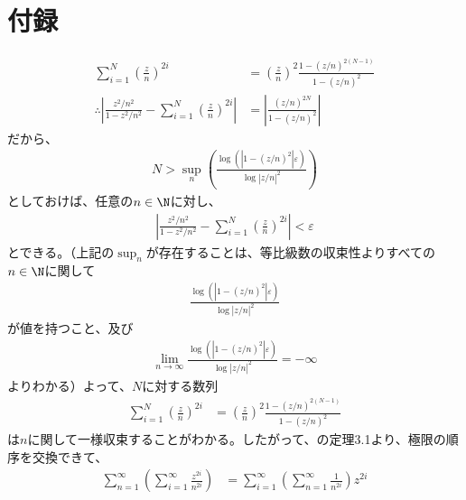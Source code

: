 \documentclass[10pt,onecolumn,dvipdfmx]{jsarticle}
\begin{document}
\section*{付録}
\begin{align}
\sum_{i=1} ^{N} \left( \frac{z}{n} \right) ^{2i} &= \left( \frac{z}{n} \right) ^{2} \frac{1-\left( z / n\right) ^{2\left( N - 1\right) } }{1 - \left( z / n\right) ^{2} } \\
\therefore \left| \frac{z^2 / n^2 }{1 - z^2 / n^2 } - \sum_{i=1} ^{N} \left( \frac{z}{n} \right) ^{2i} \right| &= \left| \frac{\left( z / n\right) ^{2N} }{1 - \left( z / n\right) ^{2} } \right| 
\end{align}
だから、
\begin{align}
N>\sup_{n} \left( \frac{\log{\left( \left| 1 - \left( z / n\right) ^{2} \right| \varepsilon \right) } }{\log{\left| z / n\right| ^{2} } } \right) 
\end{align}
としておけば、任意の$n\in \N $に対し、
\begin{align}
\left| \frac{z^2 / n^2 }{1 - z^2 / n^2 } - \sum_{i=1} ^{N} \left( \frac{z}{n} \right) ^{2i} \right| < \varepsilon 
\end{align}
とできる。（上記の$\sup_{n} $が存在することは、等比級数の収束性よりすべての$n\in \N $に関して
\begin{align}
\frac{\log{\left( \left| 1 - \left( z / n\right) ^{2} \right| \varepsilon \right) } }{\log{\left| z / n\right| ^{2} } } 
\end{align}
が値を持つこと、及び
\begin{align}
\lim_{n\to \infty } \frac{\log{\left( \left| 1 - \left( z / n\right) ^{2} \right| \varepsilon \right) } }{\log{\left| z / n\right| ^{2} } } = -\infty 
\end{align}
よりわかる）よって、$N$に対する数列
\begin{align}
\sum_{i=1} ^{N} \left( \frac{z}{n} \right) ^{2i} &= \left( \frac{z}{n} \right) ^{2} \frac{1-\left( z / n\right) ^{2\left( N - 1\right) } }{1 - \left( z / n\right) ^{2} } 
\end{align}
は$n$に関して一様収束することがわかる。したがって、\cite{doubleSeries}の定理3.1より、極限の順序を交換できて、
\begin{align}
\sum_{n=1} ^{\infty } \left( \sum_{i=1} ^{\infty } \frac{z^{2i} }{n^{2i} } \right) &= \sum_{i=1} ^{\infty } \left( \sum_{n=1} ^{\infty } \frac{1}{n^{2i} } \right) z^{2i} 
\end{align}
\end{document}
